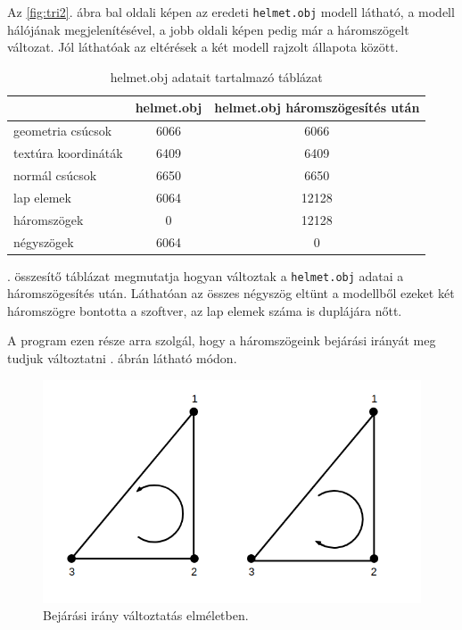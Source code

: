 Az \ref{fig:tri2}. ábra bal oldali képen az eredeti \texttt{helmet.obj} modell látható, a modell hálójának megjelenítésével, a jobb oldali képen pedig már a háromszögelt változat. Jól láthatóak az eltérések a két modell rajzolt állapota között.

\begin{table}[h]
\centering
\caption{helmet.obj adatait tartalmazó táblázat}
\bigskip
\label{tab:modellek}
\begin{tabular}{l|c|c|}
& helmet.obj & helmet.obj háromszögesítés után \\
\hline
geometria csúcsok & 6066 & 6066 \\
textúra koordináták & 6409 & 6409 \\
normál csúcsok & 6650 & 6650 \\
lap elemek & 6064 & 12128 \\
háromszögek & 0 & 12128 \\
négyszögek & 6064 & 0 \\
\hline
\end{tabular}
\label{fig:tri3}
\end{table}

. összesítő táblázat megmutatja hogyan változtak a \texttt{helmet.obj} adatai a háromszögesítés után. Láthatóan az összes négyszög eltünt a modellből ezeket két háromszögre bontotta a szoftver, az lap elemek száma is duplájára nőtt.


A program ezen része arra szolgál, hogy a háromszögeink bejárási irányát meg tudjuk változtatni . ábrán látható módon.

\begin{figure}[h]
\centering
\includegraphics[scale=0.5]{images/bejarasi.png}
\caption{Bejárási irány változtatás elméletben.}
\label{fig:bej1}
\end{figure}

